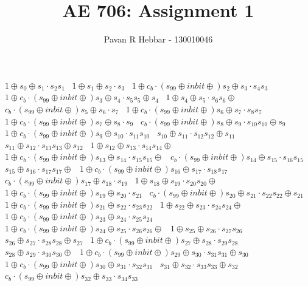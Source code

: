 \documentclass[11pt, a4paper]{article}
\title{\textbf{AE 706: Assignment 1}}
\author{Pavan R Hebbar - 130010046}
\begin{document}
$1 \oplus s_{0} \oplus s_{1} \cdot s_{2}s_{1}$ \
 $1 \oplus s_{1} \oplus s_{2} \cdot s_{3}$ \
 $1 \oplus c_{b} \cdot (s_{99} \oplus inbit \oplus )s_{2} \oplus s_{3} \cdot s_{4}s_{3}$ \
 $1 \oplus c_{b} \cdot (s_{99} \oplus inbit \oplus )s_{3} \oplus s_{4} \cdot s_{5}s_{5} \oplus s_{4}$ \
 $1 \oplus s_{4} \oplus s_{5} \cdot s_{6}s_{6} \oplus $ \
 $c_{b} \cdot (s_{99} \oplus inbit \oplus )s_{5} \oplus s_{6} \cdot s_{7}$ \
 $1 \oplus c_{b} \cdot (s_{99} \oplus inbit \oplus )s_{6} \oplus s_{7} \cdot s_{8}s_{7}$ \
 $1 \oplus c_{b} \cdot (s_{99} \oplus inbit \oplus )s_{7} \oplus s_{8} \cdot s_{9}$ \
 $c_{b} \cdot (s_{99} \oplus inbit \oplus )s_{8} \oplus s_{9} \cdot s_{10}s_{10} \oplus s_{9}$ \
 $1 \oplus c_{b} \cdot (s_{99} \oplus inbit \oplus )s_{9} \oplus s_{10} \cdot s_{11}s_{10}$ \
 $s_{10} \oplus s_{11} \cdot s_{12}s_{12} \oplus s_{11}$ \
 $s_{11} \oplus s_{12} \cdot s_{13}s_{13} \oplus s_{12}$ \
 $1 \oplus s_{12} \oplus s_{13} \cdot s_{14}s_{14} \oplus $ \
 $1 \oplus c_{b} \cdot (s_{99} \oplus inbit \oplus )s_{13} \oplus s_{14} \cdot s_{15}s_{15} \oplus $ \
 $c_{b} \cdot (s_{99} \oplus inbit \oplus )s_{14} \oplus s_{15} \cdot s_{16}s_{15}$ \
 $s_{15} \oplus s_{16} \cdot s_{17}s_{17} \oplus $ \
 $1 \oplus c_{b} \cdot (s_{99} \oplus inbit \oplus )s_{16} \oplus s_{17} \cdot s_{18}s_{17}$ \
 $c_{b} \cdot (s_{99} \oplus inbit \oplus )s_{17} \oplus s_{18} \cdot s_{19}$ \
 $1 \oplus s_{18} \oplus s_{19} \cdot s_{20}s_{20} \oplus $ \
 $1 \oplus c_{b} \cdot (s_{99} \oplus inbit \oplus )s_{19} \oplus s_{20} \cdot s_{21}$ \
 $c_{b} \cdot (s_{99} \oplus inbit \oplus )s_{20} \oplus s_{21} \cdot s_{22}s_{22} \oplus s_{21}$ \
 $1 \oplus c_{b} \cdot (s_{99} \oplus inbit \oplus )s_{21} \oplus s_{22} \cdot s_{23}s_{22}$ \
 $1 \oplus s_{22} \oplus s_{23} \cdot s_{24}s_{24} \oplus $ \
 $1 \oplus c_{b} \cdot (s_{99} \oplus inbit \oplus )s_{23} \oplus s_{24} \cdot s_{25}s_{24}$ \
 $1 \oplus c_{b} \cdot (s_{99} \oplus inbit \oplus )s_{24} \oplus s_{25} \cdot s_{26}s_{26} \oplus $ \
 $1 \oplus s_{25} \oplus s_{26} \cdot s_{27}s_{26}$ \
 $s_{26} \oplus s_{27} \cdot s_{28}s_{28} \oplus s_{27}$ \
 $1 \oplus c_{b} \cdot (s_{99} \oplus inbit \oplus )s_{27} \oplus s_{28} \cdot s_{29}s_{28}$ \
 $s_{28} \oplus s_{29} \cdot s_{30}s_{30} \oplus $ \
 $1 \oplus c_{b} \cdot (s_{99} \oplus inbit \oplus )s_{29} \oplus s_{30} \cdot s_{31}s_{31} \oplus s_{30}$ \
 $1 \oplus c_{b} \cdot (s_{99} \oplus inbit \oplus )s_{30} \oplus s_{31} \cdot s_{32}s_{31}$ \
 $s_{31} \oplus s_{32} \cdot s_{33}s_{33} \oplus s_{32}$ \
 $c_{b} \cdot (s_{99} \oplus inbit \oplus )s_{32} \oplus s_{33} \cdot s_{34}s_{33}$ \
\end{document}

